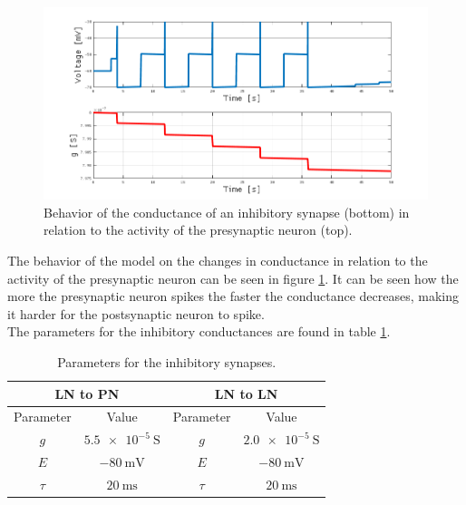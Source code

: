     \begin{figure}
      \centering
      \includegraphics[width=\textwidth]{inhibitory-synapses-conductance}
      \caption{Behavior of the conductance of an inhibitory synapse (bottom) in relation to the activity of the presynaptic neuron (top).}
      \label{fig:inhibitory-synapses-conductance}
    \end{figure}

    The behavior of the model on the changes in conductance in relation to the activity of the presynaptic neuron can be seen in figure \ref{fig:inhibitory-synapses-conductance}.
    It can be seen how the more the presynaptic neuron spikes the faster the conductance decreases, making it harder for the postsynaptic neuron to spike.\\
    The parameters for the inhibitory conductances are found in table \ref{tab:inhibitory-synapses-parameters}.

    \begin{table}
      \centering
      \begin{tabular}{ c c | c c }
        \hline
        \multicolumn{2}{c}{LN to PN} & \multicolumn{2}{c}{LN to LN}\\
        \hline
        Parameter & Value & Parameter & Value\\
        $g$ & $\SI{5.5e-5}{\siemens}$ & $g$ & $\SI{2.0e-5}{\siemens}$\\
        $E$ & $\SI{-80}{\milli\volt}$ & $E$ & $\SI{-80}{\milli\volt}$\\
        $\tau$ & $\SI{20}{\milli\second}$ & $\tau$ & $\SI{20}{\milli\second}$\\
        \hline
      \end{tabular}
      \caption{Parameters for the inhibitory synapses.}
      \label{tab:inhibitory-synapses-parameters}
    \end{table}



